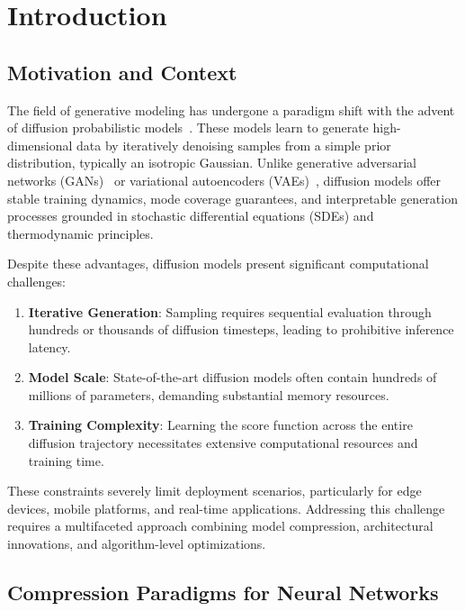\documentclass[12pt]{report}
\theoremstyle{definition}
\begin{document}
\tableofcontents
\listoffigures
\listoftables

\newpage
{}

\chapter{Introduction}

\section{Motivation and Context}

The field of generative modeling has undergone a paradigm shift with the advent of diffusion probabilistic models~\citep{sohl2015deep, ho2020denoising, song2020score}. These models learn to generate high-dimensional data by iteratively denoising samples from a simple prior distribution, typically an isotropic Gaussian. Unlike generative adversarial networks (GANs)~\citep{goodfellow2014generative} or variational autoencoders (VAEs)~\citep{kingma2013auto}, diffusion models offer stable training dynamics, mode coverage guarantees, and interpretable generation processes grounded in stochastic differential equations (SDEs) and thermodynamic principles.

Despite these advantages, diffusion models present significant computational challenges:

\begin{enumerate}
    \item \textbf{Iterative Generation}: Sampling requires sequential evaluation through hundreds or thousands of diffusion timesteps, leading to prohibitive inference latency.
    \item \textbf{Model Scale}: State-of-the-art diffusion models often contain hundreds of millions of parameters, demanding substantial memory resources.
    \item \textbf{Training Complexity}: Learning the score function across the entire diffusion trajectory necessitates extensive computational resources and training time.
\end{enumerate}

These constraints severely limit deployment scenarios, particularly for edge devices, mobile platforms, and real-time applications. Addressing this challenge requires a multifaceted approach combining model compression, architectural innovations, and algorithm-level optimizations.

\section{Compression Paradigms for Neural Networks}
\end{document}
